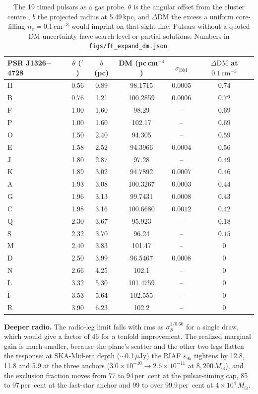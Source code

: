 \documentclass[11pt]{article}
\newcommand{\msun}{\ensuremath{M_\odot}}
\newcommand{\epsl}{\ensuremath{\varepsilon_{95}}}
\begin{document}
\begin{table}[htbp]
\centering
\small
\caption{The 19 timed pulsars as a gas probe. $\theta$ is the angular offset from the cluster centre \citep{ColomiBernadich2026}, $b$ the projected radius at 5.49\,kpc, and $\Delta\mathrm{DM}$ the excess a uniform core-filling $n_{e} = 0.1\,\mathrm{cm^{-3}}$ would imprint on that sight line. Pulsars without a quoted DM uncertainty have search-level or partial solutions. Numbers in \texttt{figs/fF\_expand\_dm.json}.}
\label{tab:dm}
\begin{tabular}{lccccc}
\toprule
PSR J1326$-$4728 & $\theta$ ($'$) & $b$ (pc) & DM (pc\,cm$^{-3}$) & $\sigma_{\mathrm{DM}}$ & $\Delta\mathrm{DM}$ at $0.1\,\mathrm{cm^{-3}}$ \\
\midrule
H & 0.56 & 0.89 & 98.1715 & $0.0005$ & $0.74$ \\
B & 0.76 & 1.21 & 100.2859 & $0.0006$ & $0.72$ \\
F & 1.00 & 1.60 & 98.29 & -- & $0.69$ \\
P & 1.00 & 1.60 & 102.17 & -- & $0.69$ \\
O & 1.50 & 2.40 & 94.305 & -- & $0.59$ \\
E & 1.58 & 2.52 & 94.3966 & $0.0004$ & $0.56$ \\
J & 1.80 & 2.87 & 97.28 & -- & $0.49$ \\
K & 1.89 & 3.02 & 94.7892 & $0.0007$ & $0.46$ \\
A & 1.93 & 3.08 & 100.3267 & $0.0003$ & $0.44$ \\
G & 1.96 & 3.13 & 99.7431 & $0.0008$ & $0.43$ \\
C & 1.98 & 3.16 & 100.6680 & $0.0012$ & $0.42$ \\
Q & 2.30 & 3.67 & 95.923 & -- & $0.18$ \\
S & 2.32 & 3.70 & 96.24 & -- & $0.15$ \\
M & 2.40 & 3.83 & 101.47 & -- & $0$ \\
D & 2.50 & 3.99 & 96.5467 & $0.0008$ & $0$ \\
N & 2.66 & 4.25 & 102.1 & -- & $0$ \\
L & 3.32 & 5.30 & 101.4759 & -- & $0$ \\
I & 3.53 & 5.64 & 102.555 & -- & $0$ \\
R & 3.90 & 6.23 & 102.2 & -- & $0$ \\
\bottomrule
\end{tabular}
\end{table}

\textbf{Deeper radio.} The radio-leg limit falls with rms as $\sigma_{S}^{1/0.60}$ for a single draw, which would give a factor of 46 for a tenfold improvement. The realized marginal gain is much smaller, because the plane's scatter and the other two legs flatten the response: at SKA-Mid-era depth ($\sim$0.1\,$\mu$Jy) the RIAF \epsl{} tightens by 12.8, 11.8 and 5.9 at the three anchors ($3.0\times10^{-10} \rightarrow 2.6\times10^{-11}$ at $8{,}200\,\msun$), and the exclusion fraction moves from 77 to 94\,per~cent at the pulsar-timing cap, 85 to 97\,per~cent at the fast-star anchor and 99 to over 99.9\,per~cent at $4\times10^{4}\,\msun$.
\end{document}
